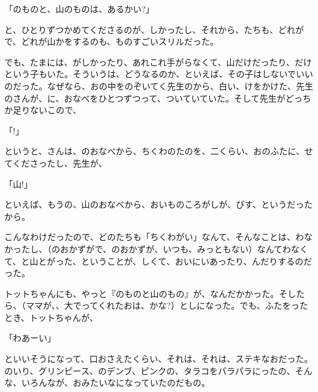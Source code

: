 「のものと、山のものは、あるかい?」

と、ひとりずつかめてくださるのが、しかったし、それから、たちも、どれがで、どれが山かをするのも、ものすごいスリルだった。

でも、たまには、がしかったり、あれこれ手がらなくて、山だけだったり、だけという子もいた。そういうは、どうなるのか、といえば、その子はしないでいいのだった。なぜなら、おの中をのぞいてく先生のから、白い、けをかけた、先生のさんが、に、おなべをひとつずつって、ついていていた。そして先生がどっちか足りないこので、

「!」

というと、さんは、のおなべから、ちくわのたのを、二くらい、おのふたに、せてくださったし、先生が、

「山!」

といえば、もうの、山のおなべから、おいものころがしが、びす、というだったから。

こんなわけだったので、どのたちも「ちくわがい」なんて、そんなことは、わなかったし、（のおかずがで、のおかずが、いつも、みっともない）なんてわなくて、と山とがった、ということが、しくて、おいにいあったり、んだりするのだった。

トットちゃんにも、やっと『のものと山のもの』が、なんだかかった。そしたら、（ママが、、大でってくれたおは、かな?）としになった。でも、ふたをったとき、トットちゃんが、

「わあーい」

といいそうになって、口おさえたくらい、それは、それは、ステキなおだった。のいり、グリンピース、のデンブ、ピンクの、タラコをパラパラにったの、そんな、いろんなが、おみたいなになっていたのだもの。

